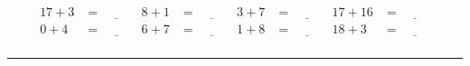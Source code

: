 \documentclass{article}
\begin{document}
\begin{sloppy}
\begin{align*}
    {17} + {3} &= \underline{\hspace{1cm}} & {8} + {1} &= \underline{\hspace{1cm}} & {3} + {7} &= \underline{\hspace{1cm}} & {17} + {16} &= \underline{\hspace{1cm}} \\
    {0} + {4} &= \underline{\hspace{1cm}} & {6} + {7} &= \underline{\hspace{1cm}} & {1} + {8} &= \underline{\hspace{1cm}} & {18} + {3} &= \underline{\hspace{1cm}} \\
\end{align*}
\hrule
\end{sloppy}
\end{document}
